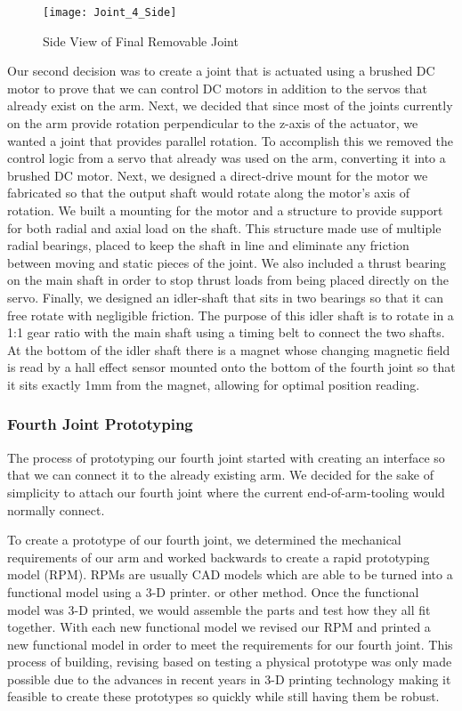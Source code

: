 \begin{figure}[H]
\centering
\texttt{[image: Joint\_4\_Side]}
\caption{Side View of Final Removable Joint}
\label{fig:Side View of Joint 4}
\end{figure}

\noindent Our second decision was to create a joint that is actuated using a brushed DC motor to prove that we can control DC motors in addition to the servos that already exist on the arm.  Next, we decided that since most of the joints currently on the arm provide rotation perpendicular to the z-axis of the actuator, we wanted a joint that provides parallel rotation. To accomplish this we removed the control logic from a servo that already was used on the arm, converting it into a brushed DC motor. Next, we designed a direct-drive mount for the motor we fabricated so that the output shaft would rotate along the motor's axis of rotation.  We built a mounting for the motor and a structure to provide support for both radial and axial load on the shaft. This structure made use of multiple radial bearings, placed to keep the shaft in line and eliminate any friction between moving and static pieces of the joint.  We also included a thrust bearing on the main shaft in order to stop thrust loads from being placed directly on the servo.  Finally, we designed an idler-shaft that sits in two bearings so that it can free rotate with negligible friction. The purpose of this idler shaft is to rotate in a 1:1 gear ratio with the main shaft using a timing belt to connect the two shafts.  At the bottom of the idler shaft there is a magnet whose changing magnetic field is read by a hall effect sensor mounted onto the bottom of the fourth joint so that it sits exactly 1mm from the magnet, allowing for optimal position reading.  \\

\subsubsection{Fourth Joint Prototyping}
The process of prototyping our fourth joint started with creating an interface so that we can connect it to the already existing arm.  We decided for the sake of simplicity to attach our fourth joint where the current end-of-arm-tooling would normally connect. %

\noindent To create a prototype of our fourth joint, we determined the mechanical requirements of our arm and worked backwards to create a rapid prototyping model (RPM).  RPMs are usually CAD models which are able to be turned into a functional model using a 3-D printer. or other method.  Once the functional model was 3-D printed, we would assemble the parts and test how they all fit together.  With each new functional model we revised our RPM and printed a new functional model in order to meet the requirements for our fourth joint. This process of building, revising based on testing a physical prototype was only made possible due to the advances in recent years in 3-D printing technology making it feasible to create these prototypes so quickly while still having them be robust. 

